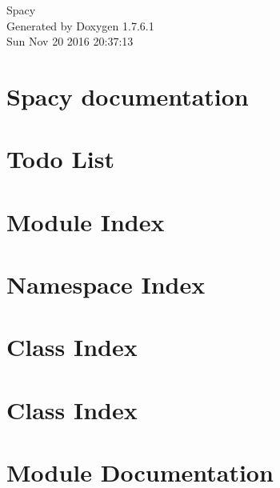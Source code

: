 \documentclass[a4paper]{book}
\begin{document}
\hypersetup{pageanchor=false,citecolor=blue}
\begin{titlepage}
\vspace*{7cm}
\begin{center}
{\Large \-Spacy }\\
\vspace*{1cm}
{\large \-Generated by Doxygen 1.7.6.1}\\
\vspace*{0.5cm}
{\small Sun Nov 20 2016 20:37:13}\\
\end{center}
\end{titlepage}
\clearemptydoublepage
{}
\tableofcontents
\clearemptydoublepage
{}
\hypersetup{pageanchor=true,citecolor=blue}
\chapter{\-Spacy documentation}
\label{index}\hypertarget{index}{}
\chapter{\-Todo \-List}
\label{todo}
\hypertarget{todo}{}

\chapter{\-Module \-Index}

\chapter{\-Namespace \-Index}

\chapter{\-Class \-Index}

\chapter{\-Class \-Index}

\chapter{\-Module \-Documentation}














\end{document}
